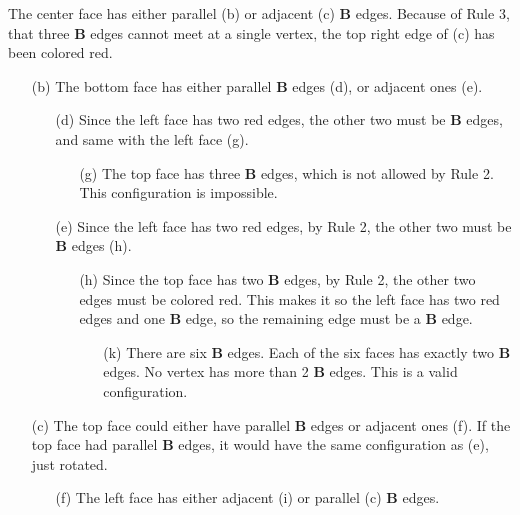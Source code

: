 \documentclass[12pt]{scrippsthesis}
\theoremstyle{definition}
\theoremstyle{remark}
\theoremstyle{plain}
\begin{document}
The center face has either parallel (b) or adjacent (c) {\bf B} edges.  Because of Rule 3, that three {\bf B} edges cannot meet at a single vertex, the top right edge of (c) has been colored red.
\begin{itemize}
\item[(b)] The bottom face has either parallel {\bf B} edges (d), or adjacent ones (e). 

	\begin{itemize}
	\item[(d)] Since the left face has two red edges, the other two must be {\bf B} edges, and same with the left face (g).
	
		\begin{itemize}
		\item[(g)]  The top face has three {\bf B} edges, which is not allowed by Rule 2.  This configuration is impossible.

		
		\end{itemize}	
	
	\item[(e)] Since the left face has two red edges, by Rule 2, the other two must be {\bf B} edges (h).
	
		\begin{itemize}
		\item[(h)] Since the top face has two {\bf B} edges, by Rule 2, the other two edges must be colored red.  This makes it so the left face has two red edges and one {\bf B} edge, so the remaining edge must be a {\bf B} edge.
		
			\begin{itemize}
			\item[(k)] There are six {\bf B} edges.  Each of the six faces has exactly two {\bf B} edges.  No vertex has more than 2 {\bf B} edges.  This is a valid configuration.

			\end{itemize}
		
		\end{itemize}
	
	\end{itemize}

\item[(c)] The top face could either have parallel {\bf B} edges or adjacent ones (f).  If the top face had parallel {\bf B} edges, it would have the same configuration as (e), just rotated.  

	\begin{itemize}
	\item[(f)] The left face has either adjacent (i) or parallel (c) {\bf B} edges.
	

\end{itemize}
\end{itemize}
\end{document}
